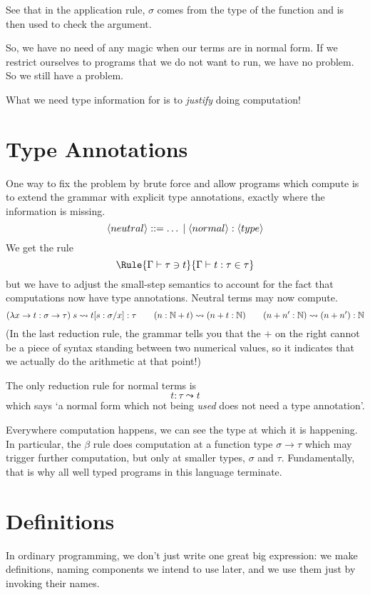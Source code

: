 \documentclass{article}
\begin{document}
See that in the application rule, $\sigma$ comes from the type of the
function and is then used to check the argument.

So, we have no need of any magic when our terms are in normal form. If we
restrict ourselves to programs that we do not want to run, we have no
problem. So we still have a problem.

What we need type information for is to \emph{justify} doing computation!


\section{Type Annotations}

One way to fix the problem by brute force and allow programs which compute
is to extend the grammar with explicit type annotations, exactly where the
information is missing.
\[
  \langle neutral \rangle ::= \ldots \;|\; \langle normal \rangle:\langle type \rangle
\]
We get the rule
\[
  \Rule{\Gamma\vdash \tau\ni t}
    {\Gamma\vdash t:\tau \in \tau}
\]
but we have to adjust the small-step semantics to account for the fact that
computations now have type annotations. Neutral terms may now compute.
\[
  (\lambda x\to t : \sigma\to\tau)\;s \leadsto
  t[s:\sigma/x]:\tau \qquad
  (n:\mathbb{N} + t) \leadsto (n + t:\mathbb{N}) \qquad
  (n + n':\mathbb{N}) \leadsto (n + n'):\mathbb{N}
\]
(In the last reduction rule, the grammar tells you that the $+$ on the right
cannot be a piece of syntax standing between two numerical values, so it
indicates that we actually do the arithmetic at that point!)

The only reduction rule for normal terms is
\[
  t : \tau \leadsto t
\]
which says `a normal form which not being \emph{used} does not need a
type annotation'.

Everywhere computation happens, we can see the type at which it is happening.
In particular, the $\beta$ rule does computation at a function type
$\sigma\to\tau$ which may trigger further computation, but only at
smaller types, $\sigma$ and $\tau$. Fundamentally, that is why all well
typed programs in this language terminate.


\section{Definitions}

In ordinary programming, we don't just write one great big expression: we
make definitions, naming components we intend to use later, and we use them
just by invoking their names.
\end{document}
